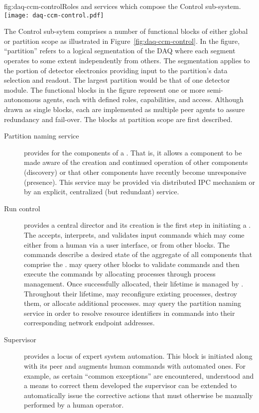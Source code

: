 \begin{dunefigure}{fig:daq-ccm-control}{Roles and services which compose the  Control sub-system.}
  \texttt{[image: daq-ccm-control.pdf]}
\end{dunefigure}

The Control sub-sytem comprises a number of functional blocks of either global or partition scope as illustrated in Figure~\ref{fig:daq-ccm-control}. 
In the figure, ``partition'' refers to a logical segmentation of the DAQ where each segment operates to some extent independently from others. 
The segmentation applies to the portion of detector electronics providing input to the partition's data selection and readout. 
The largest partition would be that of one detector module.
The functional blocks in the figure represent one or more semi-autonomous agents, each with defined roles, capabilities, and access. 
Although drawn as single blocks, each are implemented as multiple peer agents to assure redundancy and fail-over. 
The blocks at partition scope are first described.

\begin{description}
\item[Partition naming service] provides  for the components of a . 
  That is, it allows a component to be made aware  of the creation and continued operation of other components (discovery) or that other components have recently become unresponsive (presence). 
  This service may be provided via distributed IPC mechanism or by an explicit, centralized (but redundant) service.

\item[Run control] provides a central director and its creation is the first step in initiating a . 
  The  accepts, interprets, and validates input commands which may come either from a human via a user interface, or from other blocks. 
  The commands describe a desired state of the aggregate of all components that comprise the . 
   may query other blocks to validate commands and then execute the commands by allocating processes through process management. 
  Once successfully allocated, their lifetime is managed by . 
  Throughout their lifetime,  may reconfigure existing processes, destroy them, or allocate additional processes. 
   may query the partition naming service in order to resolve resource identifiers in commands into their corresponding network endpoint addresses.  

\item[Supervisor] provides a locus of expert system automation. 
  This block is initiated along with its  peer and augments human commands with automated ones. 
  For example, as certain ``common exceptions'' are encountered, understood and a means to correct them developed the supervisor can be extended to automatically issue the corrective actions that must otherwise be manually performed by a human operator.

\end{description}

